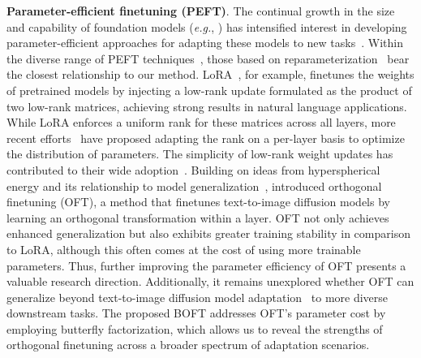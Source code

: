 \textbf{Parameter-efficient finetuning (PEFT)}. The continual growth in the size and capability of foundation models (\emph{e.g.}, \cite{brown2020language,radford2021learning,rombach2022high,kirillov2023segment}) has intensified interest in developing parameter-efficient approaches for adapting these models to new tasks~\cite{treviso2023efficient,ding2023parameter,lialin2023scaling}. Within the diverse range of PEFT techniques~\cite{houlsby2019parameter,aghajanyan2020intrinsic,hulora2022,edalati2022krona,wang2022adamix,gheini2021cross,zaken2022bitfit,guo2020parameter,sung2021training,ansell2022composable,lester2021power,li2021prefix,vu2022spot,he2021towards,mao2021unipelt,karimi2021compacter,liu2022few,sung2022lst,chen2022parameter,jia2022visual,chen2022adaptformer,zhang2022neural,jie2023fact,lian2022scaling,luo2023towards}, those based on reparameterization~\cite{aghajanyan2020intrinsic,hulora2022,edalati2022krona} bear the closest relationship to our method. LoRA~\cite{hulora2022}, for example, finetunes the weights of pretrained models by injecting a low-rank update formulated as the product of two low-rank matrices, achieving strong results in natural language applications. While LoRA enforces a uniform rank for these matrices across all layers, more recent efforts~\cite{zhang2022adaptive,valipour2022dylora,zhang2023increlora} have proposed adapting the rank on a per-layer basis to optimize the distribution of parameters. The simplicity of low-rank weight updates has contributed to their wide adoption~\cite{dettmers2023qlora,zi2023delta,chavan2023one}. Building on ideas from hyperspherical energy and its relationship to model generalization~\cite{liu2018learning,liu2021orthogonal}, \cite{qiu2023controlling} introduced orthogonal finetuning (OFT), a method that finetunes text-to-image diffusion models by learning an orthogonal transformation within a layer. OFT not only achieves enhanced generalization but also exhibits greater training stability in comparison to LoRA, although this often comes at the cost of using more trainable parameters. Thus, further improving the parameter efficiency of OFT presents a valuable research direction. Additionally, it remains unexplored whether OFT can generalize beyond text-to-image diffusion model adaptation~\cite{qiu2023controlling} to more diverse downstream tasks. The proposed BOFT addresses OFT's parameter cost by employing butterfly factorization, which allows us to reveal the strengths of orthogonal finetuning across a broader spectrum of adaptation scenarios.

